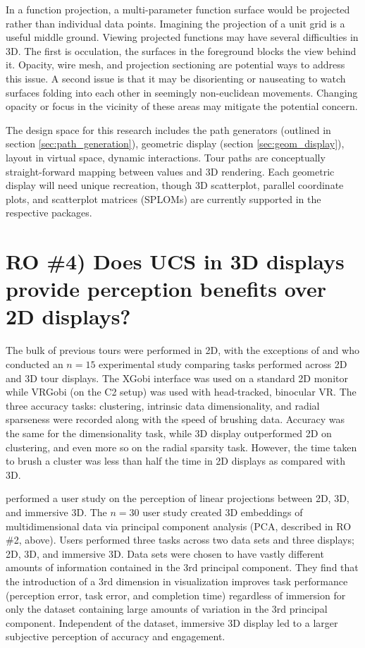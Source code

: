 \documentclass{monashthesis}
\begin{document}
In a function projection, a multi-parameter function surface would be
projected rather than individual data points. Imagining the projection
of a unit grid is a useful middle ground. Viewing projected functions
may have several difficulties in 3D. The first is occulation, the
surfaces in the foreground blocks the view behind it. Opacity, wire
mesh, and projection sectioning are potential ways to address this
issue. A second issue is that it may be disorienting or nauseating to
watch surfaces folding into each other in seemingly non-euclidean
movements. Changing opacity or focus in the vicinity of these areas may
mitigate the potential concern.

The design space for this research includes the path generators
(outlined in section \ref{sec:path_generation}), geometric display
(section \ref{sec:geom_display}), layout in virtual space, dynamic
interactions. Tour paths are conceptually straight-forward mapping
between values and 3D rendering. Each geometric display will need unique
recreation, though 3D scatterplot, parallel coordinate plots, and
scatterplot matrices (SPLOMs) are currently supported in the respective
packages.

\section{RO \#4) Does UCS in 3D displays provide perception benefits
over 2D displays?}\label{UCS_3dvs2d}

The bulk of previous tours were performed in 2D, with the exceptions of
\textcite{nelson_xgobi_1998} and \textcite{arms_benefits_1999} who
conducted an \(n=15\) experimental study comparing tasks performed
across 2D and 3D tour displays. The XGobi interface was used on a
standard 2D monitor while VRGobi (on the C2 setup) was used with
head-tracked, binocular VR. The three accuracy tasks: clustering,
intrinsic data dimensionality, and radial sparseness were recorded along
with the speed of brushing data. Accuracy was the same for the
dimensionality task, while 3D display outperformed 2D on clustering, and
even more so on the radial sparsity task. However, the time taken to
brush a cluster was less than half the time in 2D displays as compared
with 3D.

\textcite{wagner_filho_immersive_2018} performed a user study on the
perception of linear projections between 2D, 3D, and immersive 3D. The
\(n=30\) user study created 3D embeddings of multidimensional data via
principal component analysis (PCA, described in RO \#2, above). Users
performed three tasks across two data sets and three displays; 2D, 3D,
and immersive 3D. Data sets were chosen to have vastly different amounts
of information contained in the 3rd principal component. They find that
the introduction of a 3rd dimension in visualization improves task
performance (perception error, task error, and completion time)
regardless of immersion for only the dataset containing large amounts of
variation in the 3rd principal component. Independent of the dataset,
immersive 3D display led to a larger subjective perception of accuracy
and engagement.
\end{document}
